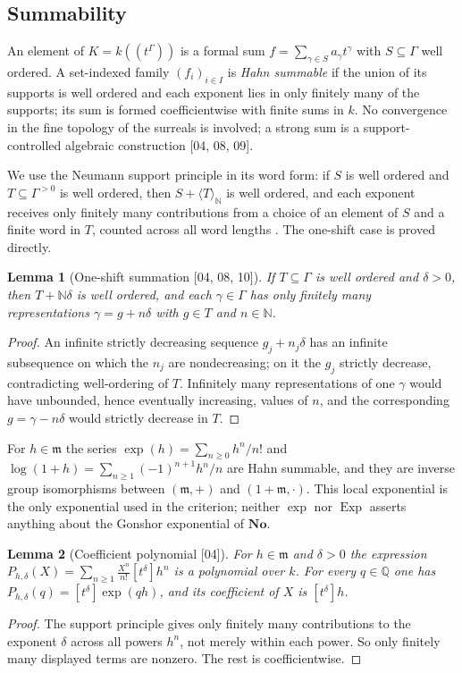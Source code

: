 \documentclass[11pt,oneside]{article}
\numberwithin{equation}{section}
\newtheorem{lemma}[lemma]{Lemma}
\theoremstyle{definition}
\theoremstyle{remark}
\newcommand{\No}{\mathbf{No}}
\newcommand{\Q}{\mathbb Q}
\newcommand{\N}{\mathbb N}
\newcommand{\mm}{\mathfrak m}
\newcommand{\Exp}{\operatorname{Exp}}
\newcommand{\Hahn}[2]{#1((t^{#2}))}
\newcommand{\coef}[2]{[t^{#1}]#2}
\newcommand{\src}[1]{\textup{\textsf{\small[#1]}}}
\begin{document}
\subsection{Summability}

An element of $K=\Hahn k\Gamma$ is a formal sum $f=\sum_{\gamma\in S}a_\gamma
t^\gamma$ with $S\subseteq\Gamma$ well ordered. A set-indexed family
$(f_i)_{i\in I}$ is \emph{Hahn summable} if the union of its supports is well
ordered and each exponent lies in only finitely many of the supports; its sum
is formed coefficientwise with finite sums in $k$. No convergence in the fine
topology of the surreals is involved; a strong sum is a support-controlled
algebraic construction \src{04, 08, 09}.

We use the Neumann support principle in its word form: if $S$ is well ordered
and $T\subseteq\Gamma^{>0}$ is well ordered, then $S+\langle T\rangle_\N$ is well
ordered, and each exponent receives only finitely many contributions from a
choice of an element of $S$ and a finite word in $T$, counted across all word
lengths \cite{BKKPS}. The one-shift case is proved directly.

\begin{lemma}[One-shift summation \src{04, 08, 10}]\label{opa:lem:shift}
If $T\subseteq\Gamma$ is well ordered and $\delta>0$, then $T+\N\delta$ is well
ordered, and each $\gamma\in\Gamma$ has only finitely many representations
$\gamma=g+n\delta$ with $g\in T$ and $n\in\N$.
\end{lemma}
\begin{proof}
An infinite strictly decreasing sequence $g_j+n_j\delta$ has an infinite
subsequence on which the $n_j$ are nondecreasing; on it the $g_j$ strictly
decrease, contradicting well-ordering of $T$. Infinitely many representations
of one $\gamma$ would have unbounded, hence eventually increasing, values of
$n$, and the corresponding $g=\gamma-n\delta$ would strictly decrease in $T$.
\end{proof}

For $h\in\mm$ the series $\exp(h)=\sum_{n\ge0}h^n/n!$ and
$\log(1+h)=\sum_{n\ge1}(-1)^{n+1}h^n/n$ are Hahn summable, and they are
inverse group isomorphisms between $(\mm,+)$ and $(1+\mm,\cdot)$. This local
exponential is the only exponential used in the criterion; neither $\exp$ nor
$\Exp$ asserts anything about the Gonshor exponential of $\No$.

\begin{lemma}[Coefficient polynomial \src{04}]\label{opa:lem:polynomial}
For $h\in\mm$ and $\delta>0$ the expression
$P_{h,\delta}(X)=\sum_{n\ge1}\frac{X^n}{n!}\coef\delta{h^n}$ is a polynomial
over $k$. For every $q\in\Q$ one has $P_{h,\delta}(q)=\coef\delta{\exp(qh)}$,
and its coefficient of $X$ is $\coef\delta h$.
\end{lemma}
\begin{proof}
The support principle gives only finitely many contributions to the exponent
$\delta$ across all powers $h^n$, not merely within each power. So only
finitely many displayed terms are nonzero. The rest is coefficientwise.
\end{proof}
\end{document}
